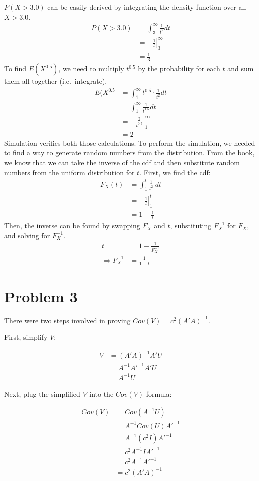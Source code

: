 \documentclass{article}
\begin{document}
$P( X > 3.0 )$ can be easily derived by integrating the density function over
all $X > 3.0$.
\begin{align*}
  P( X > 3.0 ) &= \int_{3}^{\infty} \frac{1}{t^2} dt \\
               &= \left.-\frac{1}{t} \right|_3^\infty \\
               &= \frac{1}{3}
\end{align*}
To find $E(X^{0.5})$, we need to multiply $t^{0.5}$ by the probability for each
$t$ and sum them all together (i.e.\ integrate).
\begin{align*}
  E( X^{0.5} &= \int_1^\infty t^{0.5}\cdot\frac{1}{t^2} dt \\
  &= \int_1^\infty \frac{1}{t^{1.5}} dt \\
  &=\left. - \frac{2}{t^{0.5}} \right|_1^\infty \\
  &= 2
\end{align*}
Simulation verifies both those calculations. To perform the simulation, we needed to
find a way to generate random numbers from the distribution. From the book, we
know that we can take the inverse of the cdf and then substitute random
numbers from the uniform distribution for $t$. First, we find the cdf:
\begin{align*}
  F_X(t) &= \int_1^t \frac{1}{t^2} \ dt \\
         &= \left. - \frac{1}{t} \right|_1^t \\
         &= 1 - \frac{1}{t}
\end{align*}
Then, the inverse can be found by swapping $F_X$ and $t$, substituting
$F_X^{-1}$ for $F_X$, and solving for $F_X^{-1}$.
\begin{align*}
  t &= 1 - \frac{1}{F_X^{-1}} \\
  \Rightarrow F_X^{-1} &= \frac{1}{1 - t}
\end{align*}

\section*{Problem 3}

There were two steps involved in proving $Cov(V) = c^{2}(A'A)^{-1}$.

First, simplify $V$:

\begin{align*}
  V &= (A'A)^{-1}A'U \\
    &= A^{-1}A'^{-1}A'U \\
    &= A^{-1}U
\end{align*}

Next, plug the simplified $V$ into the $Cov(V)$ formula:

\begin{align*}
  Cov(V) &= Cov(A^{-1}U) \\
         &= A^{-1}Cov(U)A'^{-1} \\
         &= A^{-1}(c^{2}I)A'^{-1} \\
         &= c^{2}A^{-1}IA'^{-1} \\
         &= c^{2}A^{-1}A'^{-1} \\
         &= c^{2}(A'A)^{-1}
\end{align*}
\end{document}
